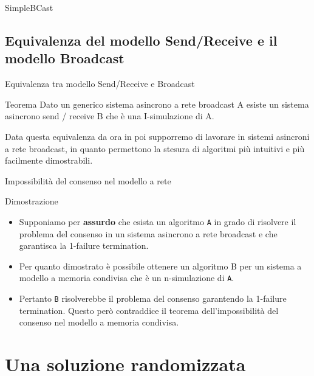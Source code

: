 \documentclass{beamer}
\begin{document}
\begin{frame}{SimpleBCast}

\end{frame}


\subsection{Equivalenza del modello Send/Receive e il modello Broadcast}

\begin{frame}{Equivalenza tra modello Send/Receive e Broadcast}
    \begin{block}{Teorema}
        Dato un generico sistema asincrono a rete broadcast A esiste un sistema asincrono send / receive B che è una I-simulazione di A.
    \end{block}

    \vspace{0.5cm}

    Data questa equivalenza da ora in poi supporremo di lavorare in sistemi asincroni a rete broadcast, in quanto permettono la stesura di algoritmi più intuitivi e più facilmente dimostrabili.
\end{frame}


\begin{frame}{Impossibilità del consenso nel modello a rete}
    \begin{block}{Dimostrazione}
    \begin{itemize}
        \item Supponiamo per \textbf{assurdo} che esista un algoritmo \texttt{A} in grado di risolvere il problema del consenso in un sistema asincrono a rete broadcast e che garantisca la 1-failure termination.
        \item Per quanto dimostrato è possibile ottenere un algoritmo B per un sistema a modello a memoria condivisa che è un n-simulazione di \texttt{A}.
        \item Pertanto \texttt{B} risolverebbe il problema del consenso garantendo la 1-failure termination. Questo però contraddice il teorema dell'impossibilità del consenso nel modello a memoria condivisa.
    \end{itemize}
    \end{block}
\end{frame}


\section{Una soluzione randomizzata}
\end{document}
